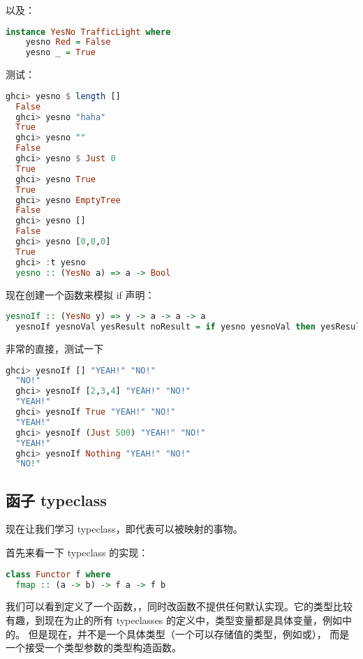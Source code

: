 \documentclass[./main.tex]{subfiles}
\begin{document}
以及：

\begin{lstlisting}[language=Haskell]
  instance YesNo TrafficLight where
    yesno Red = False
    yesno _ = True
\end{lstlisting}

测试：

\begin{lstlisting}[language=Haskell]
  ghci> yesno $ length []
  False
  ghci> yesno "haha"
  True
  ghci> yesno ""
  False
  ghci> yesno $ Just 0
  True
  ghci> yesno True
  True
  ghci> yesno EmptyTree
  False
  ghci> yesno []
  False
  ghci> yesno [0,0,0]
  True
  ghci> :t yesno
  yesno :: (YesNo a) => a -> Bool
\end{lstlisting}

现在创建一个函数来模拟 if 声明：

\begin{lstlisting}[language=Haskell]
  yesnoIf :: (YesNo y) => y -> a -> a -> a
  yesnoIf yesnoVal yesResult noResult = if yesno yesnoVal then yesResult else noResult
\end{lstlisting}

非常的直接，测试一下

\begin{lstlisting}[language=Haskell]
  ghci> yesnoIf [] "YEAH!" "NO!"
  "NO!"
  ghci> yesnoIf [2,3,4] "YEAH!" "NO!"
  "YEAH!"
  ghci> yesnoIf True "YEAH!" "NO!"
  "YEAH!"
  ghci> yesnoIf (Just 500) "YEAH!" "NO!"
  "YEAH!"
  ghci> yesnoIf Nothing "YEAH!" "NO!"
  "NO!"
\end{lstlisting}


\subsection*{函子 typeclass}

现在让我们学习 typeclass，即代表可以被映射的事物。

首先来看一下 typeclass 的实现：

\begin{lstlisting}[language=Haskell]
class Functor f where
  fmap :: (a -> b) -> f a -> f b
\end{lstlisting}

我们可以看到定义了一个函数，，同时改函数不提供任何默认实现。它的类型比较有趣，到现在为止的所有
typeclasses 的定义中，类型变量都是具体变量，例如中的。
但是现在，并不是一个具体类型（一个可以存储值的类型，例如或），
而是一个接受一个类型参数的类型构造函数。
\end{document}
